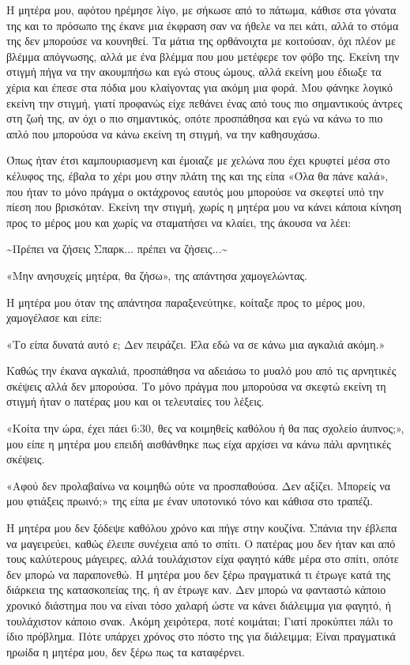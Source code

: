 \documentclass[12pt,twoside, openany]{book}
\begin{document}
Η μητέρα μου, αφότου ηρέμησε λίγο, με σήκωσε από το πάτωμα, κάθισε στα γόνατα της και το πρόσωπο της έκανε μια έκφραση σαν να ήθελε να πει κάτι, αλλά το στόμα της δεν μπορούσε να κουνηθεί. Τα μάτια της ορθάνοιχτα με κοιτούσαν, όχι πλέον με βλέμμα απόγνωσης, αλλά με ένα βλέμμα που μου μετέφερε τον φόβο της. Εκείνη την στιγμή πήγα να την ακουμπήσω και εγώ στους ώμους, αλλά εκείνη μου έδιωξε τα χέρια και έπεσε στα πόδια μου κλαίγοντας για ακόμη μια φορά. Μου φάνηκε λογικό εκείνη την στιγμή, γιατί προφανώς είχε πεθάνει ένας από τους πιο σημαντικούς άντρες στη ζωή της, αν όχι ο πιο σημαντικός, οπότε προσπάθησα και εγώ να κάνω το πιο απλό που μπορούσα να κάνω εκείνη τη στιγμή, να την καθησυχάσω.

Όπως ήταν έτσι καμπουριασμενη και έμοιαζε με χελώνα που έχει κρυφτεί μέσα στο κέλυφος της, έβαλα το χέρι μου στην πλάτη της και της είπα «Όλα θα πάνε καλά», που ήταν το μόνο πράγμα ο οκτάχρονος εαυτός μου μπορούσε να σκεφτεί υπό την πίεση που βρισκόταν. Εκείνη την στιγμή, χωρίς η μητέρα μου να κάνει κάποια κίνηση προς το μέρος μου και χωρίς να σταματήσει να κλαίει, της άκουσα να λέει:

\textasciitilde Πρέπει να ζήσεις Σπαρκ... πρέπει να ζήσεις...\textasciitilde

«Μην ανησυχείς μητέρα, θα ζήσω», της απάντησα χαμογελώντας.

Η μητέρα μου όταν της απάντησα παραξενεύτηκε, κοίταξε προς το μέρος μου, χαμογέλασε και είπε:

«Το είπα δυνατά αυτό ε; Δεν πειράζει. Έλα εδώ να σε κάνω μια αγκαλιά ακόμη.»

Καθώς την έκανα αγκαλιά, προσπάθησα να αδειάσω το μυαλό μου από τις αρνητικές σκέψεις αλλά δεν μπορούσα. Το μόνο πράγμα που μπορούσα να σκεφτώ εκείνη τη στιγμή ήταν ο πατέρας μου και οι τελευταίες του λέξεις.

«Κοίτα την ώρα, έχει πάει 6:30, θες να κοιμηθείς καθόλου ή θα πας σχολείο άυπνος;», μου είπε η μητέρα μου επειδή αισθάνθηκε πως είχα αρχίσει να κάνω πάλι αρνητικές σκέψεις.

«Αφού δεν προλαβαίνω να κοιμηθώ ούτε να προσπαθούσα. Δεν αξίζει. Μπορείς να μου φτιάξεις πρωινό;» της είπα με έναν υποτονικό τόνο και κάθισα στο τραπέζι.

Η μητέρα μου δεν ξόδεψε καθόλου χρόνο και πήγε στην κουζίνα. Σπάνια την έβλεπα να μαγειρεύει, καθώς έλειπε συνέχεια από το σπίτι. Ο πατέρας μου δεν ήταν και από τους καλύτερους μάγειρες, αλλά τουλάχιστον είχα φαγητό κάθε μέρα στο σπίτι, οπότε δεν μπορώ να παραπονεθώ. Η μητέρα μου δεν ξέρω πραγματικά τι έτρωγε κατά της διάρκεια της κατασκοπείας της, ή αν έτρωγε καν. Δεν μπορώ να φανταστώ κάποιο χρονικό διάστημα που να είναι τόσο χαλαρή ώστε να κάνει διάλειμμα για φαγητό, ή τουλάχιστον κάποιο σνακ. Ακόμη χειρότερα, ποτέ κοιμάται; Γιατί προκύπτει πάλι το ίδιο πρόβλημα. Πότε υπάρχει χρόνος στο πόστο της για διάλειμμα; Είναι πραγματικά ηρωίδα η μητέρα μου, δεν ξέρω πως τα καταφέρνει.
\end{document}
